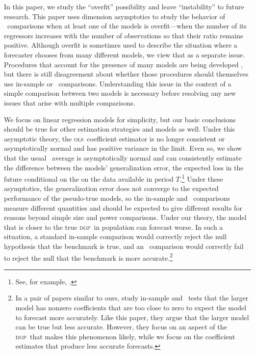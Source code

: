 \documentclass[11pt]{article}
\newcommand{\ols}{\textsc{ols}}
\newcommand{\dgp}{\textsc{dgp}}
\begin{document}
In this paper, we study the ``overfit'' possibility and leave
``instability'' to future research. This paper uses dimension
asymptotics to study the behavior of \oos\ comparisons when at least
one of the models is overfit---when the number of its regressors
increases with the number of observations so that their ratio remains
positive.  Although overfit is sometimes used to describe the
situation where a forecaster chooses from many different models, we
view that as a separate issue.  Procedures that account for the
presence of many models are being developed \citep[see, for
example,][]{Whi:00,RoW:05}, but there is still disagreement about
whether those procedures should themselves use in-sample or \oos\
comparisons.  Understanding this issue in the context of a simple
comparison between two models is necessary before resolving any new
issues that arise with multiple comparisons.

We focus on linear regression models for simplicity, but our basic
conclusions should be true for other estimation strategies and models
as well.  Under this asymptotic theory, the \ols\ coefficient
estimator is no longer consistent or asymptotically normal
\citep{Hub:73} and has positive variance in the limit.  Even so, we
show that the usual \oos\ average is asymptotically normal and can
consistently estimate the difference between the models'
generalization error, the expected loss in the future conditional on
the on the data available in period $T$.\footnote{See, for example,
  \citet{HTF:08}.}  Under these asymptotics, the generalization error
does not converge to the expected performance of the pseudo-true
models, so the in-sample and \oos\ comparisons measure different
quantities and should be expected to give different results for
reasons beyond simple size and power comparisons.  Under our theory,
the model that is closer to the true \dgp\ in population can forecast
worse.  In such a situation, a standard in-sample comparison would
correctly reject the null hypothesis that the benchmark is true, and
an \oos\ comparison would correctly fail to reject the null that the
benchmark is more accurate.\footnote{In a pair of papers similar to
  ours, \citet{ClM:09,ClM:09b} study in-sample and \oos\ tests that
  the larger model has nonzero coefficients that are too close to zero
  to expect the model to forecast more accurately.  Like this paper,
  they argue that the larger model can be true but less accurate.
  However, they focus on an aspect of the \dgp\ that makes this
  phenomenon likely, while we focus on the coefficient estimates that
  produce less accurate forecasts.}
\end{document}
